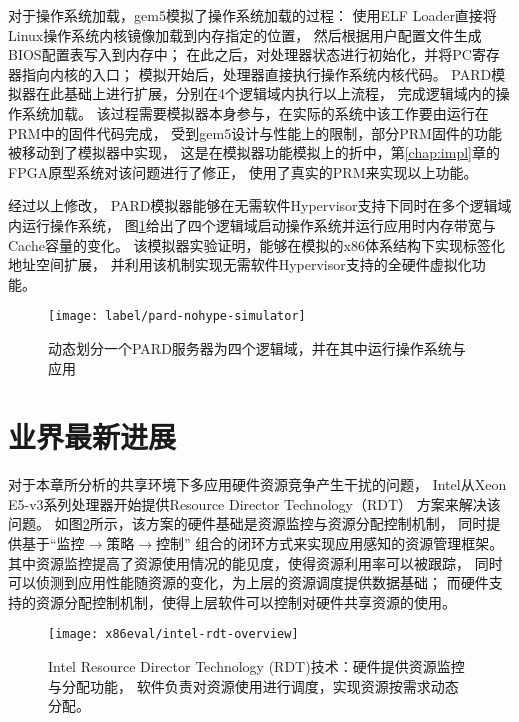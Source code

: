 对于操作系统加载，gem5模拟了操作系统加载的过程：
使用ELF Loader直接将Linux操作系统内核镜像加载到内存指定的位置，
然后根据用户配置文件生成BIOS配置表写入到内存中；
在此之后，对处理器状态进行初始化，并将PC寄存器指向内核的入口；
模拟开始后，处理器直接执行操作系统内核代码。
PARD模拟器在此基础上进行扩展，分别在4个逻辑域内执行以上流程，
完成逻辑域内的操作系统加载。
该过程需要模拟器本身参与，在实际的系统中该工作要由运行在PRM中的固件代码完成，
受到gem5设计与性能上的限制，部分PRM固件的功能被移动到了模拟器中实现，
这是在模拟器功能模拟上的折中，第\ref{chap:impl}章的FPGA原型系统对该问题进行了修正，
使用了真实的PRM来实现以上功能。

经过以上修改，
PARD模拟器能够在无需软件Hypervisor支持下同时在多个逻辑域内运行操作系统，
图\ref{fig:pard-nohype-simulator}给出了四个逻辑域启动操作系统并运行应用时内存带宽与Cache容量的变化。
该模拟器实验证明，能够在模拟的x86体系结构下实现标签化地址空间扩展，
并利用该机制实现无需软件Hypervisor支持的全硬件虚拟化功能。

\begin{figure}[tb]
  \centering
  \texttt{[image: label/pard-nohype-simulator]}
  \caption{动态划分一个PARD服务器为四个逻辑域，并在其中运行操作系统与应用}
  \label{fig:pard-nohype-simulator}
\end{figure}


\section{业界最新进展}
\label{chap:labeladdrspace:intel-rdt}

对于本章所分析的共享环境下多应用硬件资源竞争产生干扰的问题，
Intel从Xeon E5-v3系列处理器开始提供Resource Director Technology（RDT）\cite{intel-rdt}
方案来解决该问题。
如图\ref{fig:intel-rdt-overview}所示，该方案的硬件基础是资源监控与资源分配控制机制，
同时提供基于``监控$\rightarrow$策略$\rightarrow$控制''
组合的闭环方式来实现应用感知的资源管理框架。
其中资源监控提高了资源使用情况的能见度，使得资源利用率可以被跟踪，
同时可以侦测到应用性能随资源的变化，为上层的资源调度提供数据基础；
而硬件支持的资源分配控制机制，使得上层软件可以控制对硬件共享资源的使用。

\begin{figure}[H]
  \centering
  \texttt{[image: x86eval/intel-rdt-overview]}
  \caption[Intel Resource Director Technology (RDT) 技术示意图]{
    Intel Resource Director Technology (RDT)技术：硬件提供资源监控与分配功能，
    软件负责对资源使用进行调度，实现资源按需求动态分配。}
  \label{fig:intel-rdt-overview}
\end{figure}

